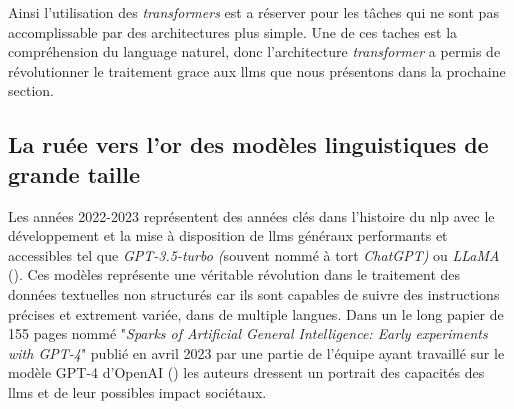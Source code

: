Ainsi l'utilisation des \textit{transformers} est a réserver pour les tâches qui ne sont pas accomplissable par des architectures plus simple. Une de ces taches est la compréhension du language naturel, donc l'architecture \textit{transformer} a permis de révolutionner le traitement grace aux \gls{llms} que nous présentons dans la prochaine section.

\subsection{La ruée vers l'or des modèles linguistiques de grande taille}
Les années 2022-2023 représentent des années clés dans l’histoire du \gls{nlp} avec le développement et la mise à disposition de \gls{llms} généraux performants et accessibles tel que \textit{GPT-3.5-turbo (}souvent nommé à tort \textit{ChatGPT)} ou \textit{LLaMA} (\cite{touvron_llama_2023}).  Ces modèles représente une véritable révolution dans le traitement des données textuelles non structurés car ils sont capables de suivre des instructions précises et extrement variée, dans de multiple langues. Dans un le long papier de 155 pages nommé "\textit{Sparks of Artificial General Intelligence: Early experiments with GPT-4}" publié en avril 2023 par une partie de l'équipe ayant travaillé sur le modèle GPT-4 d'OpenAI (\cite{bubeck_sparks_2023}) les auteurs dressent un portrait des capacités des \gls{llms} et de leur possibles impact sociétaux.

